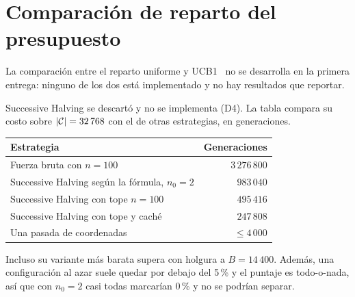 \section{Comparación de reparto del presupuesto}
\label{sec:reparto}

La comparación entre el reparto uniforme y UCB1~\cite{auer2002} no se desarrolla en la
primera entrega: ninguno de los dos está implementado y no hay resultados que reportar.

Successive Halving se descartó y no se implementa (D4). La tabla compara su costo sobre
$|\mathcal{C}|=32\,768$ con el de otras estrategias, en generaciones.

\begin{center}
\begin{tabular}{lr}
\toprule
Estrategia & Generaciones \\
\midrule
Fuerza bruta con $n=100$ & $3\,276\,800$ \\
Successive Halving según la fórmula, $n_0=2$ & $983\,040$ \\
Successive Halving con tope $n=100$ & $495\,416$ \\
Successive Halving con tope y caché & $247\,808$ \\
Una pasada de coordenadas & $\le 4\,000$ \\
\bottomrule
\end{tabular}
\end{center}

Incluso su variante más barata supera con holgura a $B=14\,400$. Además, una configuración
al azar suele quedar por debajo del 5\,\% y el puntaje es todo-o-nada, así que con $n_0=2$
casi todas marcarían 0\,\% y no se podrían separar.
